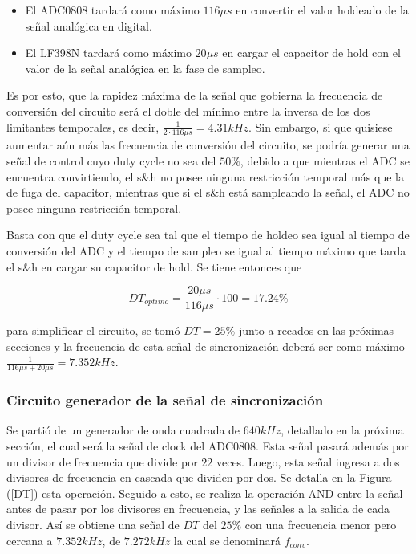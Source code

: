 \begin{itemize}
\item El ADC0808 tardará como máximo $116\mu s$ en convertir el valor holdeado de la señal analógica en digital.
\item El LF398N tardará como máximo $20\mu s$ en cargar el capacitor de hold con el valor de la señal analógica en la fase de sampleo.
\end{itemize}

Es por esto, que la rapidez máxima de la señal que gobierna la frecuencia de conversión del circuito será el doble del mínimo entre la inversa de los dos limitantes temporales, es decir, $\frac{1}{2\cdot 116\mu s} = 4.31kHz$. Sin embargo, si que quisiese aumentar aún más las frecuencia de conversión del circuito, se podría generar una señal de control cuyo duty cycle no sea del $50\%$, debido a que mientras el ADC se encuentra convirtiendo, el s\&h no posee ninguna restricción temporal más que la de fuga del capacitor, mientras que si el s\&h está sampleando la señal, el ADC no posee ninguna restricción temporal.


Basta con que el duty cycle sea tal que el tiempo de holdeo sea igual al tiempo de conversión del ADC y el tiempo de sampleo se igual al tiempo máximo que tarda el s\&h en cargar su capacitor de hold. Se tiene entonces que

\begin{equation}
DT_{optimo} = \frac{20\mu s}{116\mu s}\cdot 100 = 17.24\% 
\end{equation}

para simplificar el circuito, se tomó $DT = 25\%$ junto a recados en las próximas secciones y la frecuencia de esta señal de sincronización deberá ser como máximo $\frac{1}{116\mu s + 20\mu s} = 7.352kHz$.

\subsubsection{Circuito generador de la señal de sincronización}

Se partió de un generador de onda cuadrada de $640kHz$, detallado en la próxima sección, el cual será la señal de clock del ADC0808. Esta señal pasará además por un divisor de frecuencia que divide por $22$ veces. Luego, esta señal ingresa a dos divisores de frecuencia en cascada que dividen por dos. Se detalla en la Figura (\ref{DT}) esta operación. Seguido a esto, se realiza la operación AND entre la señal antes de pasar por los divisores en frecuencia, y las señales a la salida de cada divisor. Así se obtiene una señal de $DT$ del $25\%$ con una frecuencia menor pero cercana a $7.352kHz$, de $7.272kHz$ la cual se denominará $f_{conv}$.

